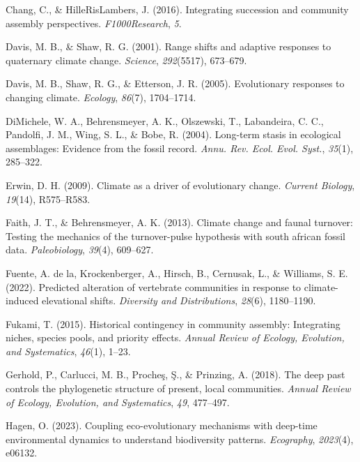 \documentclass[
]{agujournal2019}
\newlength{\cslhangindent}
\newenvironment{CSLReferences}[2] %
 {\begin{list}{}{%
  \setlength{\itemindent}{0pt}
  \setlength{\leftmargin}{0pt}
  \setlength{\parsep}{0pt}
  \ifodd #1
   \setlength{\leftmargin}{\cslhangindent}
   \setlength{\itemindent}{-1\cslhangindent}
  \fi
  \setlength{\itemsep}{#2\baselineskip}}}
 {\end{list}}
\begin{document}
\begin{CSLReferences}{1}{0}
Chang, C., \& HilleRisLambers, J. (2016). Integrating succession and
community assembly perspectives. \emph{F1000Research}, \emph{5}.

Davis, M. B., \& Shaw, R. G. (2001). Range shifts and adaptive responses
to quaternary climate change. \emph{Science}, \emph{292}(5517),
673--679.

Davis, M. B., Shaw, R. G., \& Etterson, J. R. (2005). Evolutionary
responses to changing climate. \emph{Ecology}, \emph{86}(7), 1704--1714.

DiMichele, W. A., Behrensmeyer, A. K., Olszewski, T., Labandeira, C. C.,
Pandolfi, J. M., Wing, S. L., \& Bobe, R. (2004). Long-term stasis in
ecological assemblages: Evidence from the fossil record. \emph{Annu.
Rev. Ecol. Evol. Syst.}, \emph{35}(1), 285--322.

Erwin, D. H. (2009). Climate as a driver of evolutionary change.
\emph{Current Biology}, \emph{19}(14), R575--R583.

Faith, J. T., \& Behrensmeyer, A. K. (2013). Climate change and faunal
turnover: Testing the mechanics of the turnover-pulse hypothesis with
south african fossil data. \emph{Paleobiology}, \emph{39}(4), 609--627.

Fuente, A. de la, Krockenberger, A., Hirsch, B., Cernusak, L., \&
Williams, S. E. (2022). Predicted alteration of vertebrate communities
in response to climate-induced elevational shifts. \emph{Diversity and
Distributions}, \emph{28}(6), 1180--1190.

Fukami, T. (2015). Historical contingency in community assembly:
Integrating niches, species pools, and priority effects. \emph{Annual
Review of Ecology, Evolution, and Systematics}, \emph{46}(1), 1--23.

Gerhold, P., Carlucci, M. B., Procheş, Ş., \& Prinzing, A. (2018). The
deep past controls the phylogenetic structure of present, local
communities. \emph{Annual Review of Ecology, Evolution, and
Systematics}, \emph{49}, 477--497.

Hagen, O. (2023). Coupling eco-evolutionary mechanisms with deep-time
environmental dynamics to understand biodiversity patterns.
\emph{Ecography}, \emph{2023}(4), e06132.


\end{CSLReferences}
\end{document}
